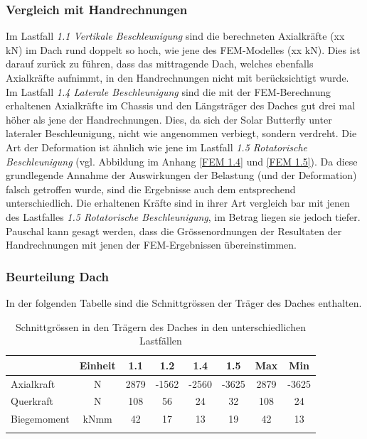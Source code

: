 \subsubsection{Vergleich mit Handrechnungen}
Im Lastfall \emph{1.1 Vertikale Beschleunigung} sind die berechneten Axialkräfte (xx kN) im Dach rund doppelt so hoch, wie jene des FEM-Modelles (xx kN). Dies ist darauf zurück zu führen, dass das mittragende Dach, welches ebenfalls Axialkräfte aufnimmt, in den Handrechnungen nicht mit berücksichtigt wurde.\\
Im Lastfall \emph{1.4 Laterale Beschleunigung} sind die mit der FEM-Berechnung erhaltenen Axialkräfte im Chassis und den Längsträger des Daches gut drei mal höher als jene der Handrechnungen. Dies, da sich der Solar Butterfly unter lateraler Beschleunigung, nicht wie angenommen verbiegt, sondern verdreht. Die Art der Deformation ist ähnlich wie jene im Lastfall \emph{1.5 Rotatorische Beschleunigung} (vgl. Abbildung im Anhang \ref{FEM 1.4} und \ref{FEM 1.5}). Da diese grundlegende Annahme der Auswirkungen der Belastung (und der Deformation) falsch getroffen wurde, sind die Ergebnisse auch dem entsprechend unterschiedlich. Die erhaltenen Kräfte sind in ihrer Art vergleich bar mit jenen des Lastfalles \emph{1.5 Rotatorische Beschleunigung}, im Betrag liegen sie jedoch tiefer.\\
Pauschal kann gesagt werden, dass die Grössenordnungen der Resultaten der Handrechnungen mit jenen der FEM-Ergebnissen übereinstimmen.

\subsubsection{Beurteilung Dach}
In der folgenden Tabelle sind die Schnittgrössen der Träger des Daches enthalten.

\begin{table}[H]
\centering
\begin{tabular}{lccccccc}
\thickhline
&	Einheit	&	1.1	&	1.2	&	1.4	&	1.5	&	Max	&	Min	\\	\hline
Axialkraft	&	N	&	2879	&	-1562	&	-2560	&	-3625	&	2879	&	-3625	\\
Querkraft	&	N	&	108	&	56	&	24	&	32	&	108	&	24	\\
Biegemoment	&	kNmm	&	42	&	17	&	13	&	19	&	42	&	13	\\	\thickhline
\end{tabular}
\caption{Schnittgrössen in den Trägern des Daches in den unterschiedlichen Lastfällen}
\label{tab:FEMres Dach}
\end{table}

